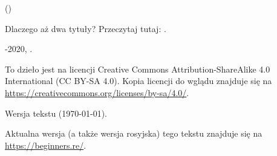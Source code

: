 ﻿\begin{titlepage}


\end{titlepage}

\newpage

\begin{center}
\vspace*{\fill}
{\LARGE \TitleMain}

\bigskip

{\large (\TitleAux)}

\bigskip
\bigskip
Dlaczego aż dwa tytuły? Przeczytaj tutaj: .

\vspace*{\fill}

{\large \AUTHOR}

{\large \TT{\EMAILPRI}}
\vspace*{\fill}
\vfill

\ccbysa

-2020, \AUTHOR. 

To dzieło jest na licencji Creative Commons Attribution-ShareAlike 4.0 International (CC BY-SA 4.0).
Kopia licencji do wglądu znajduje się na \url{https://creativecommons.org/licenses/by-sa/4.0/}.

Wersja tekstu ({\large \today}).

Aktualna wersja (a także wersja rosyjska) tego tekstu znajduje się na \url{https://beginners.re/}.

\end{center}
